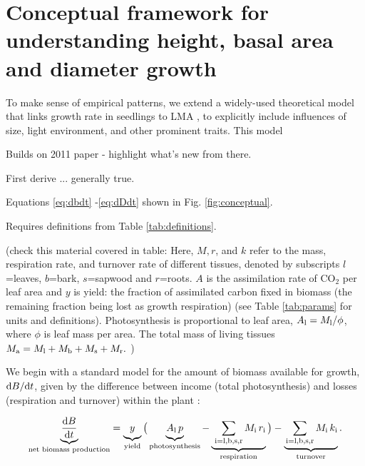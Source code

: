 \documentclass[a4paper,11pt]{article}
\begin{document}
\section{Conceptual framework for understanding height, basal area and diameter growth}

To make sense of empirical patterns, we extend a widely-used theoretical model that links growth rate in
seedlings to LMA \citep{Lambers-1992, Wright-2000}, to explicitly include influences of
size, light environment, and other prominent traits. This model

Builds on 2011 paper - highlight what's new from there.

First derive ... generally true.

Equations \ref{eq:dbdt} -\ref{eq:dDdt} shown in Fig. \ref{fig:conceptual}.
\setcounter{equation}{6}

Requires definitions from Table \ref{tab:definitions}.

(check this material covered in table: Here, $M, r$, and $k$ refer to the mass, respiration rate, and
turnover rate of different tissues, denoted by subscripts $l$=leaves,
$b$=bark, $s$=sapwood and $r$=roots. $A$ is the assimilation
rate of CO$_2$ per leaf area and $y$ is yield: the fraction of
assimilated carbon fixed in biomass (the remaining fraction being lost
as growth respiration) (see Table \ref{tab:params} for units and
definitions). Photosynthesis is proportional to leaf area,
$A_{\rm l} = M_{\rm l} / \phi$, where $\phi$ is leaf mass per area.
The total mass of living tissues $M_{\rm a}=M_{\rm l}+M_{\rm b}+M_{\rm s}+M_{\rm r}.$
)

We begin with a standard model for the amount of biomass available for
growth, ${\rm d}B / {\rm d}t$, given by the difference between income
(total photosynthesis) and losses (respiration and turnover) within the
plant \citep{Makela-1997, Thornley-2000, Falster-2011}:

\begin{equation}\label{eq:dbdt_full}
\underbrace{\strut \frac{{\rm d}B}{{\rm d}t}}_\textrm{net biomass production}
  = \underbrace{\strut y}_\textrm{yield}
    \big( \underbrace{\strut A_{\rm l} \, p}_\textrm{photosynthesis} -
     \underbrace{\strut \,\sum_\textrm{i=l,b,s,r}{M_\textrm{i} \, r_\textrm{i}}}_\textrm{respiration}\big)
    - \underbrace{\strut \sum_\textrm{i=l,b,s,r}{M_\textrm{i} \, k_\textrm{i}}}_\textrm{turnover}.
\end{equation}
\end{document}
